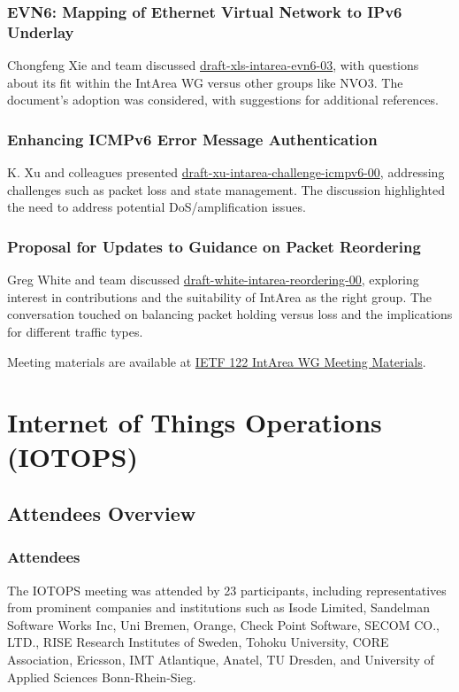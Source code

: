 \documentclass{article}
\begin{document}
\subsubsection{EVN6: Mapping of Ethernet Virtual Network to IPv6 Underlay}
Chongfeng Xie and team discussed \href{https://datatracker.ietf.org/doc/html/draft-xls-intarea-evn6-03}{draft-xls-intarea-evn6-03}, with questions about its fit within the IntArea WG versus other groups like NVO3. The document's adoption was considered, with suggestions for additional references.

\subsubsection{Enhancing ICMPv6 Error Message Authentication}
K. Xu and colleagues presented \href{https://datatracker.ietf.org/doc/html/draft-xu-intarea-challenge-icmpv6-00}{draft-xu-intarea-challenge-icmpv6-00}, addressing challenges such as packet loss and state management. The discussion highlighted the need to address potential DoS/amplification issues.

\subsubsection{Proposal for Updates to Guidance on Packet Reordering}
Greg White and team discussed \href{https://datatracker.ietf.org/doc/html/draft-white-intarea-reordering-00}{draft-white-intarea-reordering-00}, exploring interest in contributions and the suitability of IntArea as the right group. The conversation touched on balancing packet holding versus loss and the implications for different traffic types.

Meeting materials are available at \href{https://www.ietf.org/proceedings/122/intarea.html}{IETF 122 IntArea WG Meeting Materials}.



\newpage

\section{Internet of Things Operations (IOTOPS)}

\subsection{Attendees Overview}
\subsubsection{Attendees}
The IOTOPS meeting was attended by 23 participants, including representatives from prominent companies and institutions such as Isode Limited, Sandelman Software Works Inc, Uni Bremen, Orange, Check Point Software, SECOM CO., LTD., RISE Research Institutes of Sweden, Tohoku University, CORE Association, Ericsson, IMT Atlantique, Anatel, TU Dresden, and University of Applied Sciences Bonn-Rhein-Sieg.
\end{document}
